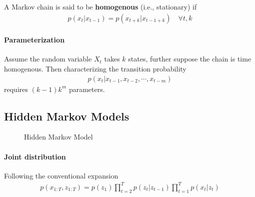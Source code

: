 \documentclass{article}
\begin{document}
	\begin{definition}
		A Markov chain is said to be \textbf{homogenous} (i.e., stationary) if
		\begin{align}
			p\left(x_{t} | x_{t-1}\right)=p\left(x_{t+k} | x_{t-1+k}\right) \quad \forall t, k
		\end{align}
	\end{definition}
	
	\paragraph{Parameterization} Assume the random variable $X_t$ takes $k$ states, further suppose the chain is time homogenous. Then characterizing the transition probability
	\begin{align}
		p(x_t | x_{t-1}, x_{t-2}, \cdots, x_{t-m})
	\end{align}
	requires $(k-1) k^m$ parameters.
	
	\subsection{Hidden Markov Models}
	\begin{figure}[H]
		\centering
		\caption{Hidden Markov Model}
	\end{figure}
	
	\paragraph{Joint distribution} Following the conventional expansion
	\begin{align}
		p(x_{1:T}, z_{1:T}) = p(z_1) \prod_{t=2}^T p(z_t|z_{t-1}) \prod_{t=1}^T p(x_t|z_t)
	\end{align}
	
\end{document}
